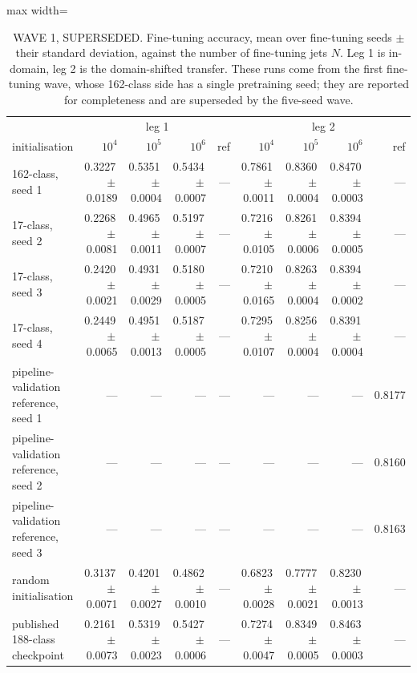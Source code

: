 \begin{table}[t]
\centering
\small
\setlength{\tabcolsep}{4pt}
\caption{WAVE 1, SUPERSEDED. Fine-tuning accuracy, mean over fine-tuning seeds $\pm$ their standard deviation, against the number of fine-tuning jets $N$. Leg 1 is in-domain, leg 2 is the domain-shifted transfer. These runs come from the first fine-tuning wave, whose 162-class side has a single pretraining seed; they are reported for completeness and are superseded by the five-seed wave.}
\label{tab:finetuning-wave1}
\begin{adjustbox}{max width=\linewidth}
\begin{tabular}{l rrrr rrrr}
\toprule
& \multicolumn{4}{c}{leg 1} & \multicolumn{4}{c}{leg 2} \\
initialisation & $10^{4}$ & $10^{5}$ & $10^{6}$ & ref & $10^{4}$ & $10^{5}$ & $10^{6}$ & ref \\
\midrule
162-class, seed 1 & 0.3227\,$\pm$\,0.0189 & 0.5351\,$\pm$\,0.0004 & 0.5434\,$\pm$\,0.0007 & --- & 0.7861\,$\pm$\,0.0011 & 0.8360\,$\pm$\,0.0004 & 0.8470\,$\pm$\,0.0003 & --- \\
17-class, seed 2 & 0.2268\,$\pm$\,0.0081 & 0.4965\,$\pm$\,0.0011 & 0.5197\,$\pm$\,0.0007 & --- & 0.7216\,$\pm$\,0.0105 & 0.8261\,$\pm$\,0.0006 & 0.8394\,$\pm$\,0.0005 & --- \\
17-class, seed 3 & 0.2420\,$\pm$\,0.0021 & 0.4931\,$\pm$\,0.0029 & 0.5180\,$\pm$\,0.0005 & --- & 0.7210\,$\pm$\,0.0165 & 0.8263\,$\pm$\,0.0004 & 0.8394\,$\pm$\,0.0002 & --- \\
17-class, seed 4 & 0.2449\,$\pm$\,0.0065 & 0.4951\,$\pm$\,0.0013 & 0.5187\,$\pm$\,0.0005 & --- & 0.7295\,$\pm$\,0.0107 & 0.8256\,$\pm$\,0.0004 & 0.8391\,$\pm$\,0.0004 & --- \\
pipeline-validation reference, seed 1 & --- & --- & --- & --- & --- & --- & --- & 0.8177 \\
pipeline-validation reference, seed 2 & --- & --- & --- & --- & --- & --- & --- & 0.8160 \\
pipeline-validation reference, seed 3 & --- & --- & --- & --- & --- & --- & --- & 0.8163 \\
random initialisation & 0.3137\,$\pm$\,0.0071 & 0.4201\,$\pm$\,0.0027 & 0.4862\,$\pm$\,0.0010 & --- & 0.6823\,$\pm$\,0.0028 & 0.7777\,$\pm$\,0.0021 & 0.8230\,$\pm$\,0.0013 & --- \\
published 188-class checkpoint & 0.2161\,$\pm$\,0.0073 & 0.5319\,$\pm$\,0.0023 & 0.5427\,$\pm$\,0.0006 & --- & 0.7274\,$\pm$\,0.0047 & 0.8349\,$\pm$\,0.0005 & 0.8463\,$\pm$\,0.0003 & --- \\
\bottomrule
\end{tabular}
\end{adjustbox}
\par{}
\end{table}
